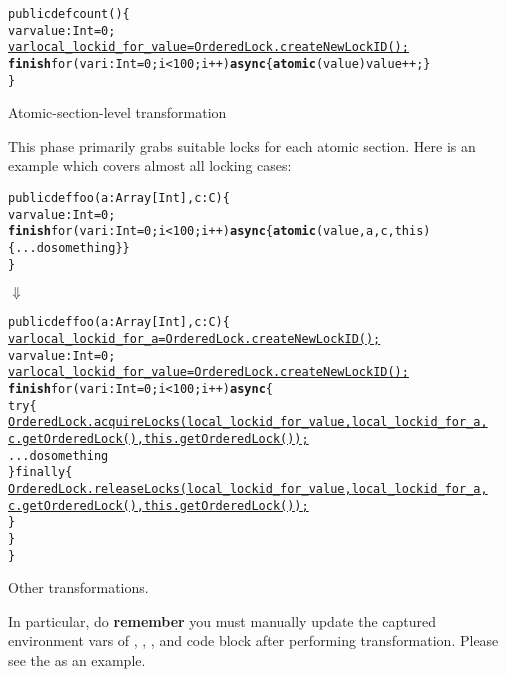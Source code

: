 \documentclass{article}
\begin{document}
\begin{enumerate}
\begin{CodeOut}
\begin{alltt}
public def count() \{
    var value:Int = 0;
    \underline{var local\_lockid\_for\_value = OrderedLock.createNewLockID();}
    \textbf{finish} for (var i:Int = 0; i < 100; i++) \textbf{async} \{ \textbf{atomic}(value) value ++; \}
\}
\end{alltt}
\end{CodeOut}


\Item Atomic-section-level transformation

This phase primarily grabs suitable locks for each atomic section.  Here is an example which covers almost all locking cases:

\begin{CodeOut}
\begin{alltt}
public def foo(a:Array[Int], c:C) \{
    var value:Int = 0;
    \textbf{finish} for (var i:Int = 0; i < 100; i++) \textbf{async} \{ \textbf{atomic}(value, a, c, this) \{ ... do something\} \}
\}
\end{alltt}
\end{CodeOut}

\hspace{10mm}$\Downarrow$

\begin{CodeOut}
\begin{alltt}
public def foo(a:Array[Int], c:C) \{
    \underline{var local\_lockid\_for\_a = OrderedLock.createNewLockID();}    
    var value:Int = 0;
    \underline{var local\_lockid\_for\_value = OrderedLock.createNewLockID();}
    \textbf{finish} for (var i:Int = 0; i < 100; i++) \textbf{async} \{
        try \{
             \underline{OrderedLock.acquireLocks( local\_lockid\_for\_value,  local\_lockid\_for\_a, }
                \underline{c.getOrderedLock(), this.getOrderedLock());}
             ...do something
        \} finally \{
              \underline{OrderedLock.releaseLocks(local\_lockid\_for\_value,  local\_lockid\_for\_a, }
                \underline{c.getOrderedLock(), this.getOrderedLock());}
        \}
   \}
\}
\end{alltt}
\end{CodeOut}

\Item Other transformations.

In particular, do \textbf{remember}  you must manually update the captured environment vars of , , , and  code block after performing transformation. Please see the  as an example.

\end{enumerate}
\end{document}
